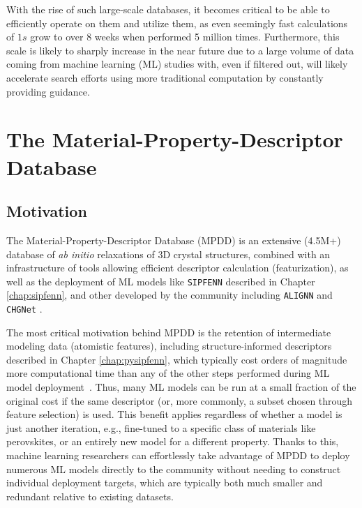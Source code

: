 With the rise of such large-scale databases, it becomes critical to be able to efficiently operate on them and utilize them, as even seemingly fast calculations of $1s$ grow to over 8 weeks when performed 5 million times. Furthermore, this scale is likely to sharply increase in the near future due to a large volume of data coming from machine learning (ML) studies with, even if filtered out, will likely accelerate search efforts using more traditional computation by constantly providing guidance.


\section{The Material-Property-Descriptor Database} \label{mpdd:sec:mpdd}

\subsection{Motivation} \label{mpdd:ssec:motivation}

The Material-Property-Descriptor Database (MPDD) is an extensive (4.5M+) database of \emph{ab initio} relaxations of 3D crystal structures,  combined with an infrastructure of tools allowing efficient descriptor calculation (featurization), as well as the deployment of ML models like \texttt{SIPFENN} \cite{Krajewski2024EfficientStructures} described in Chapter \ref{chap:sipfenn}, and other developed by the community including \texttt{ALIGNN} \cite{Choudhary2021AtomisticPredictions} and \texttt{CHGNet} \cite{Deng2023CHGNetModelling}.

The most critical motivation behind MPDD is the retention of intermediate modeling data (atomistic features), including structure-informed descriptors described in Chapter \ref{chap:pysipfenn}, which typically cost orders of magnitude more computational time than any of the other steps performed during ML model deployment~\cite{Krajewski2022ExtensibleNetworks}. Thus, many ML models can be run at a small fraction of the original cost if the same descriptor (or, more commonly, a subset chosen through feature selection) is used. This benefit applies regardless of whether a model is just another iteration, e.g., fine-tuned to a specific class of materials like perovskites, or an entirely new model for a different property. Thanks to this, machine learning researchers can effortlessly take advantage of MPDD to deploy numerous ML models directly to the community without needing to construct individual deployment targets, which are typically both much smaller and redundant relative to existing datasets.

